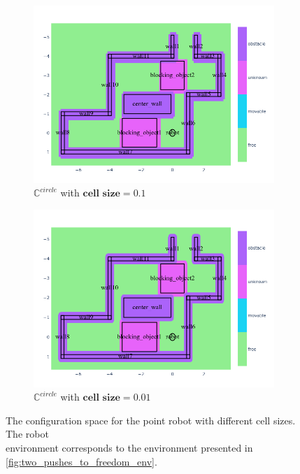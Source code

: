 \begin{figure}[H]
  \centering
  \begin{subfigure}{.49\textwidth}
    \centering
    \includegraphics[width=1.05\textwidth]{figures/planning/c_space_point_robot_grid_size_0_1}
    \caption{$\mathbb{C}^{circle}$ with $\textbf{cell size} = 0.1$}%
    \label{fig:c_space_two_pushes_small}
  \end{subfigure}
  \begin{subfigure}{.49\textwidth}
    \centering
    \includegraphics[width=1.05\textwidth]{figures/planning/c_space_point_robot_grid_size_0_01}
    \caption{$\mathbb{C}^{circle}$ with $\textbf{cell size} = 0.01$}%
    \label{fig:c_space_two_pushes_smaller}
  \end{subfigure}
  \caption{The configuration space for the point robot with different cell sizes. The robot\\environment corresponds to the environment presented in \cref{fig:two_pushes_to_freedom_env}.}
  \label{fig:two_pushes_to_freedom_conf_space}
\end{figure}

